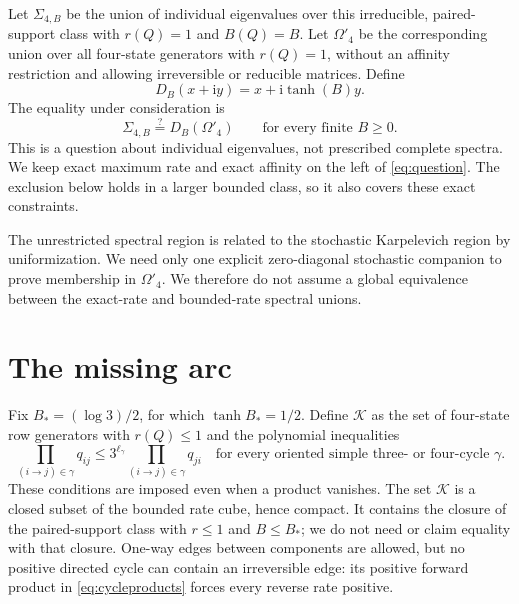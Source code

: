 \documentclass[11pt,a4paper]{article}
\newcommand{\K}{\mathcal K}
\newcommand{\ii}{\mathrm i}
\newcommand{\Bstar}{B_*}
\begin{document}
Let $\Sigma_{4,B}$ be the union of individual eigenvalues over this
irreducible, paired-support class with $r(Q)=1$ and $B(Q)=B$.
Let $\Omega'_4$ be the corresponding union over all four-state generators
with $r(Q)=1$, without an affinity restriction and allowing irreversible
or reducible matrices. Define
\begin{equation}
 D_B(x+\ii y)=x+\ii\tanh(B)y.
\end{equation}
The equality under consideration is
\begin{equation}\label{eq:question}
 \Sigma_{4,B}\stackrel{?}{=}D_B(\Omega'_4)
 \qquad\text{for every finite }B\geq0.
\end{equation}
This is a question about individual eigenvalues, not prescribed complete
spectra. We keep exact maximum rate and exact affinity on the left of
\eqref{eq:question}. The exclusion below holds in a larger bounded class,
so it also covers these exact constraints.

The unrestricted spectral region is related to the stochastic
Karpelevich region by uniformization. We need only one explicit
zero-diagonal stochastic companion to prove membership in
$\Omega'_4$. We therefore do not assume a global equivalence between
the exact-rate and bounded-rate spectral unions.

\section{The missing arc}\label{sec:result}

Fix $\Bstar=(\log3)/2$, for which $\tanh\Bstar=1/2$.
Define $\K$ as the set of four-state row generators with $r(Q)\leq1$
and the polynomial inequalities
\begin{equation}\label{eq:cycleproducts}
 \prod_{(i\to j)\in\gamma}q_{ij}
 \leq 3^{\ell_\gamma}\prod_{(i\to j)\in\gamma}q_{ji}
 \quad\text{for every oriented simple three- or four-cycle }\gamma.
\end{equation}
These conditions are imposed even when a product vanishes. The set $\K$
is a closed subset of the bounded rate cube, hence compact. It contains
the closure of the paired-support class with $r\leq1$ and $B\leq\Bstar$;
we do not need or claim equality with that closure. One-way edges between
components are allowed, but no positive directed cycle can contain an
irreversible edge: its positive forward product in
\eqref{eq:cycleproducts} forces every reverse rate positive.
\end{document}
